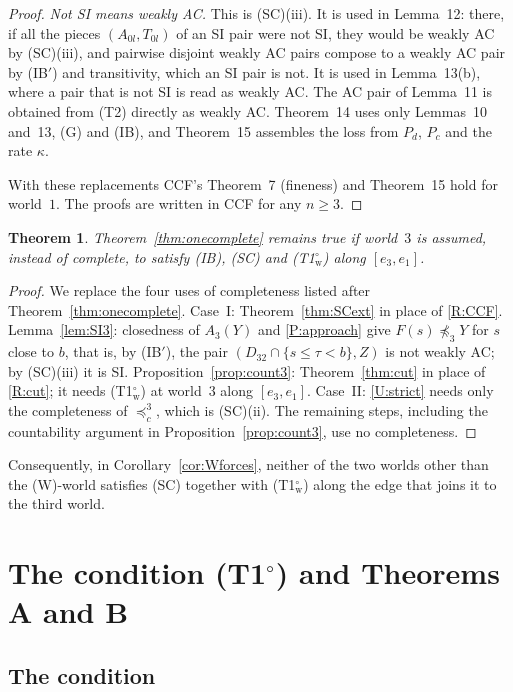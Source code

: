 \documentclass[11pt]{article}
\newtheorem{theorem}{Theorem}
\theoremstyle{definition}\newtheorem{definition}[theorem]{Definition}
\theoremstyle{remark}\newtheorem{remark}[theorem]{Remark}
\newcommand{\Tw}{\textup{(T1$^\circ_{\mathrm w}$)}}
\newcommand{\To}{\textup{(T1$^\circ$)}}
\begin{document}
\begin{proof}
\emph{Not SI means weakly AC.} This is (SC)(iii). It is used in Lemma~12:
there, if all the pieces $(A_{0l},T_{0l})$ of an SI pair were not SI, they
would be weakly AC by (SC)(iii), and pairwise disjoint weakly AC pairs
compose to a weakly AC pair by (IB$'$) and transitivity, which an SI pair is
not. It is used in Lemma~13(b), where a pair that is not SI is read as
weakly AC. The AC pair of Lemma~11 is obtained from (T2) directly as
weakly AC. Theorem~14 uses only Lemmas~10 and~13, (G) and (IB), and
Theorem~15 assembles the loss from $P_d$, $P_c$ and the rate $\kappa$.

With these replacements CCF's Theorem~7 (fineness) and Theorem~15 hold for
world~$1$. The proofs are written in CCF for any $n\ge3$.
\end{proof}

\begin{theorem}\label{thm:SC}
Theorem~\ref{thm:onecomplete} remains true if world~$3$ is assumed, instead
of complete, to satisfy (IB), (SC) and \Tw{} along $[e_3,e_1]$.
\end{theorem}
\begin{proof}
We replace the four uses of completeness listed after
Theorem~\ref{thm:onecomplete}. Case~I: Theorem~\ref{thm:SCext} in place of
\ref{R:CCF}. Lemma~\ref{lem:SI3}: closedness of $A_3(Y)$ and \ref{P:approach}
give $F(s)\not\preceq_3Y$ for $s$ close to $b$, that is, by (IB$'$), the
pair $(D_{32}\cap\{s\le\tau<b\},Z)$ is not weakly AC; by (SC)(iii) it is
SI. Proposition~\ref{prop:count3}: Theorem~\ref{thm:cut} in place of
\ref{R:cut}; it needs \Tw{} at world~$3$ along $[e_3,e_1]$. Case~II:
\ref{U:strict} needs only the completeness of $\preceq^3_c$, which is
(SC)(ii). The remaining steps, including the countability argument in
Proposition~\ref{prop:count3}, use no completeness.
\end{proof}

Consequently, in Corollary~\ref{cor:Wforces}, neither of the two worlds
other than the (W)-world satisfies (SC) together with \Tw{} along the edge
that joins it to the third world.

\section{The condition \texorpdfstring{\To}{(T1o)} and Theorems A and B}\label{sec:T1o}

\subsection{The condition}\label{sec:T1ocond}
\end{document}
